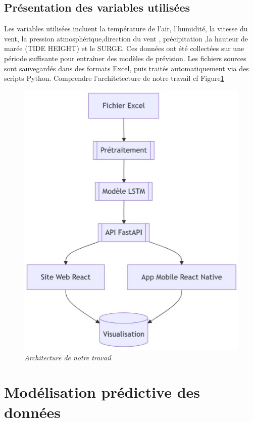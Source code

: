 \documentclass[a4paper,12pt,openany]{report}
\begin{document}
	
	\subsection{Présentation des variables  utilisées}
	\quad Les variables utilisées incluent la température de l’air, l’humidité, la vitesse du vent, la pression atmosphérique,direction du vent , précipitation ,la hauteur de marée (TIDE HEIGHT) et le SURGE. Ces données ont été collectées sur une période suffisante pour entraîner des modèles de prévision. Les fichiers sources sont sauvegardés dans des formats Excel, puis traités automatiquement via des scripts Python.
	Comprendre l'architetecture de notre travail cf Figure\ref{Fig 2.6} 
			\begin{figure}[H]
		\begin{center}
			\includegraphics[scale=0.59]{images/Travail.png}
			\caption{\emph{	Architecture de notre travail }\label{Fig 2.6}} %
		\end{center}
	\end{figure}
	
	\section{Modélisation prédictive des données}
	
\end{document}
